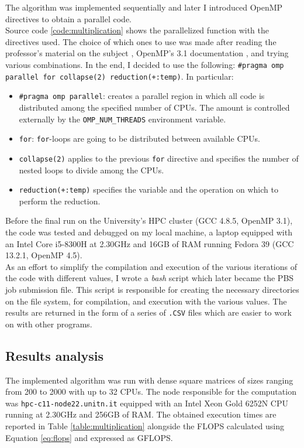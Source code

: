 The algorithm was implemented sequentially and later I introduced %
OpenMP directives to obtain a parallel code.\\%
Source code \ref{code:multiplication} shows the parallelized function with the %
directives used. The choice of which ones to use was made after reading %
the professor's material on the subject \cite{prof-slides}, OpenMP's 3.1 %
documentation \cite{openmp-cs, openmp-docs}, and trying various combinations. %
In the end, I decided to use the following: %
\texttt{\#pragma omp parallel for collapse(2) reduction(+:temp)}. In particular:
\begin{itemize}
    \item \texttt{\#pragma omp parallel}: creates a parallel region in which all %
        code is distributed among the specified number of CPUs. The amount is %
        controlled externally by the \texttt{OMP\_NUM\_THREADS} environment %
        variable.
    \item \texttt{for}: \texttt{for}-loops are going to be distributed between available %
        CPUs.
    \item \texttt{collapse(2)} applies to the previous \texttt{for} directive and %
        specifies the number of nested loops to divide among the CPUs.
    \item \texttt{reduction(+:temp)} specifies the variable and the operation on %
        which to perform the reduction.
\end{itemize}



Before the final run on the University's HPC cluster (GCC 4.8.5, OpenMP 3.1), %
the code was tested and debugged on my local machine, a laptop equipped with an %
Intel\textsuperscript{\textregistered} Core\textsuperscript{\texttrademark} %
i5-8300H at 2.30GHz and 16GB of RAM running Fedora 39 (GCC 13.2.1, OpenMP 4.5).\\%
As an effort to simplify the compilation and execution of the various iterations %
of the code with different values, I wrote a \textit{bash} script which later %
became the PBS job submission file. This script is responsible for creating the %
necessary directories on the file system, for compilation, and execution with %
the various values. The results are returned in the form of a series of %
\texttt{.CSV} files which are easier to work on with other programs.

\subsection*{Results analysis}
The implemented algorithm was run with dense square matrices of sizes ranging %
from 200 to 2000 with up to 32 CPUs. The node responsible for the computation was %
\texttt{hpc-c11-node22.unitn.it} equipped with an Intel\textsuperscript{\textregistered} %
Xeon\textsuperscript{\textregistered} Gold 6252N CPU running at 2.30GHz and 256GB %
of RAM. The obtained execution times are reported in Table \ref{table:multiplication} %
alongside the FLOPS calculated using Equation \ref{eq:flops} and expressed as %
GFLOPS.

